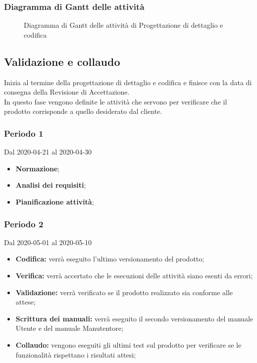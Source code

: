 \subsubsection{Diagramma di Gantt delle attività}
\begin{figure}[h]
	\caption{Diagramma di Gantt delle attività di Progettazione di dettaglio e codifica}
\end{figure}


\subsection{Validazione e collaudo}
Inizia al termine della progettazione di dettaglio e codifica e finisce con la data di consegna della Revisione di Accettazione.
\\In questo fase vengono definite le attività che servono per verificare che il prodotto corrisponde a quello desiderato dal cliente.
\subsubsection{Periodo 1} 
Dal 2020-04-21 al 2020-04-30
\begin{itemize}
	\item \textbf{Normazione};
	\item \textbf{Analisi dei requisiti};
	\item \textbf{Pianificazione attività};
\end{itemize}
\subsubsection{Periodo 2} 
Dal 2020-05-01 al 2020-05-10
\begin{itemize}
	\item \textbf{Codifica:} verrà eseguito l'ultimo versionamento del prodotto;
	\item \textbf{Verifica:} verrà accertato che le esecuzioni delle attività siano esenti da errori;
	\item \textbf{Validazione:} verrà verificato se il prodotto realizzato sia conforme alle attese;
	\item \textbf{Scrittura dei manuali:} verrà eseguito il secondo versionamento del manuale Utente e del manuale Manutentore;
	\item \textbf{Collaudo:} vengono eseguiti gli ultimi test sul prodotto per verificare se le funzionalità rispettano i risultati attesi;
\end{itemize}
